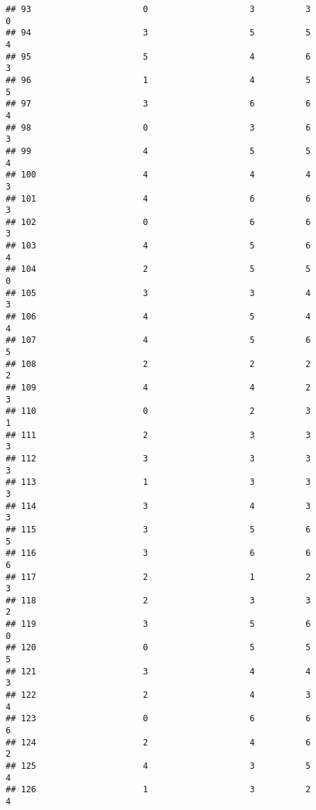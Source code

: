 \documentclass[
]{article}
\begin{document}
\begin{verbatim}
## 93                      0                    3          3               0
## 94                      3                    5          5               4
## 95                      5                    4          6               3
## 96                      1                    4          5               5
## 97                      3                    6          6               4
## 98                      0                    3          6               3
## 99                      4                    5          5               4
## 100                     4                    4          4               3
## 101                     4                    6          6               3
## 102                     0                    6          6               3
## 103                     4                    5          6               4
## 104                     2                    5          5               0
## 105                     3                    3          4               3
## 106                     4                    5          4               4
## 107                     4                    5          6               5
## 108                     2                    2          2               2
## 109                     4                    4          2               3
## 110                     0                    2          3               1
## 111                     2                    3          3               3
## 112                     3                    3          3               3
## 113                     1                    3          3               3
## 114                     3                    4          3               3
## 115                     3                    5          6               5
## 116                     3                    6          6               6
## 117                     2                    1          2               3
## 118                     2                    3          3               2
## 119                     3                    5          6               0
## 120                     0                    5          5               5
## 121                     3                    4          4               3
## 122                     2                    4          3               4
## 123                     0                    6          6               6
## 124                     2                    4          6               2
## 125                     4                    3          5               4
## 126                     1                    3          2               4

\end{verbatim}
\end{document}
